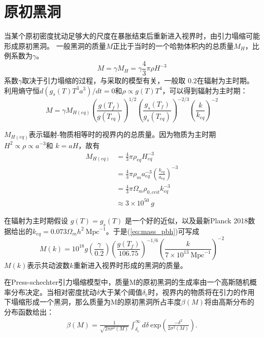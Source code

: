 \section{原初黑洞}
当某个原初密度扰动足够大的尺度在暴胀结束后重新进入视界时，由引力塌缩可能形成原初黑洞。
一般黑洞的质量$M$正比于当时的一个哈勃体积内的总质量$M_H$，比例系数为$\gamma$。
\begin{equation}
    M = \gamma M_H = \gamma \frac{4}{3}\pi\rho H^{-3}
\end{equation}
系数$\gamma$取决于引力塌缩的过程，与采取的模型有关，一般取
$0.2$在辐射为主时期\citep{carr1975primordial}。利用熵守恒$d(g_s(T)T^3a^3)/dt=0$和$\rho\propto
g(T)T^4$，可以得到辐射为主时期：
\begin{equation}
    \label{eq:mass_pbh}
    M=\gamma M_{H(eq)}{\left(\frac{g(T_f)}{g(T_{eq})}\right)}^{1/2}
    {\left(\frac{g_s(T_f)}{g_s(T_{eq})}\right)}^{-2/3}
    {\left(\frac{k}{k_{eq}}\right)}^{-2}
\end{equation}

$M_{H(eq)}$表示辐射-物质相等时的视界内的总质量。因为物质为主时期
$H^2\propto \rho \propto a^{-3}$和 $k=aH$，故有
\begin{align*}
    \label{eq:horizon_mass_eq}
    M_{H(eq)} &= \frac{4}{3}\pi\rho_{eq}H_{eq}^{-3} \\
    &= \frac{4}{3}\pi\rho_m
    a_{eq}^{-3}{\left(\frac{k_{eq}}{a_{eq}}\right)}^{-3}\\
    &= \frac{4}{3}\pi \Omega_m \rho_{0,crit}k^{-3}_{eq} \\
    &\approx 3\times 10^{50}\ g
\end{align*}

在辐射为主时期假设 $g(T)=g_s(T)$
是一个好的近似，以及最新Planck
2018数据\citep{aghanim2018planck}给出的$k_{eq}=0.073\Omega_m
h^2\ \text{Mpc}^{-1}$。于是{(\ref{eq:mass_pbh})}可写成
\begin{equation}
    M(k) =
    10^{18}g\left(\frac{\gamma}{0.2}\right){\left(\frac{g(T_f)}{106.75}\right)}^{-1/6}
    {\left(\frac{k}{7\times10^{13}\ \text{Mpc}^{-1}}\right)}^{-2}
\end{equation}
$M(k)$表示共动波数$k$重新进入视界时形成的黑洞的质量。

在Press-schechter引力塌缩模型中\citep{press1974formation}，质量M的原初黑洞的生成率由一个高斯随机概率分布决定。当相对密度扰动$\delta$大于某个阈值$\delta_c$时，视界内的物质将在引力的作用下塌缩形成一个黑洞，那么质量为M的原初黑洞所占丰度$\beta(M)$将由高斯分布的分布函数给出：
\begin{align}
    \label{eq:mass_fraction_pbh}
    \beta(M) = \frac{1}{\sqrt{2\pi \sigma^2(M)}}\int_{\delta_c}^{\infty}
    d\delta\ \text{exp}\left(\frac{-\delta^2}{2\sigma^2(M)}\right).
\end{align}

